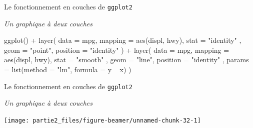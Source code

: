 \documentclass[12pt,ignorenonframetext,]{beamer}
\newenvironment{Shaded}{}{}
\newcommand{\DataTypeTok}[1]{#1}
\newcommand{\KeywordTok}[1]{\textcolor[rgb]{0.00,0.00,1.00}{#1}}
\newcommand{\NormalTok}[1]{#1}
\newcommand{\OperatorTok}[1]{#1}
\newcommand{\StringTok}[1]{\textcolor[rgb]{0.00,0.50,0.50}{#1}}
\renewenvironment{Shaded}{\begin{snugshade}}{\end{snugshade}}
\begin{document}
\begin{frame}[fragile]{\large Le fonctionnement en \og couches \fg{} de
\texttt{ggplot2}}
\protect\hypertarget{le-fonctionnement-en-couches-de-ggplot2-2}{}

\emph{Un graphique à deux couches}

\footnotesize \centering

\begin{Shaded}
\begin{Highlighting}[]
\KeywordTok{ggplot}\NormalTok{() }\OperatorTok{+}\StringTok{ }\KeywordTok{layer}\NormalTok{(}
  \DataTypeTok{data =}\NormalTok{ mpg, }\DataTypeTok{mapping =} \KeywordTok{aes}\NormalTok{(displ, hwy), }\DataTypeTok{stat =} \StringTok{"identity"}
\NormalTok{  , }\DataTypeTok{geom =} \StringTok{"point"}\NormalTok{, }\DataTypeTok{position =} \StringTok{"identity"}
\NormalTok{) }\OperatorTok{+}\StringTok{ }\KeywordTok{layer}\NormalTok{(}
  \DataTypeTok{data =}\NormalTok{ mpg, }\DataTypeTok{mapping =} \KeywordTok{aes}\NormalTok{(displ, hwy), }\DataTypeTok{stat =} \StringTok{"smooth"}
\NormalTok{  , }\DataTypeTok{geom =} \StringTok{"line"}\NormalTok{, }\DataTypeTok{position =} \StringTok{"identity"}
\NormalTok{  , }\DataTypeTok{params =} \KeywordTok{list}\NormalTok{(}\DataTypeTok{method =} \StringTok{"lm"}\NormalTok{, }\DataTypeTok{formula =}\NormalTok{ y }\OperatorTok{~}\StringTok{ }\NormalTok{x)}
\NormalTok{)}
\end{Highlighting}
\end{Shaded}

\vfill

\vfill

\end{frame}

\begin{frame}{\large Le fonctionnement en \og couches \fg{} de
\texttt{ggplot2}}
\protect\hypertarget{le-fonctionnement-en-couches-de-ggplot2-3}{}

\emph{Un graphique à deux couches}

\centering

\texttt{[image: partie2\_files/figure-beamer/unnamed-chunk-32-1]}

\end{frame}
\end{document}

